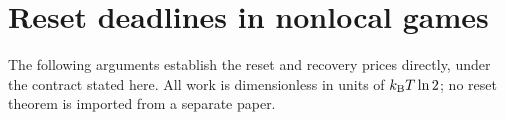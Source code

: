 \clearpage





\clearpage
\section{Reset deadlines in nonlocal games}\label{app:precision-heat}
The following arguments establish the reset and recovery prices directly, under the contract stated here. All work is dimensionless in units of $k_{\mathrm B} T\ln2$; no reset theorem is imported from a separate paper.







\clearpage

\clearpage

\clearpage





